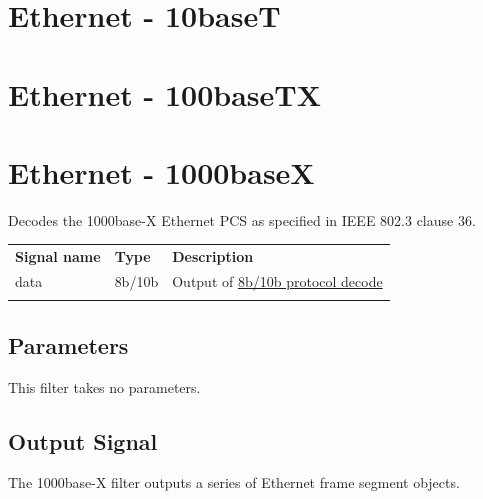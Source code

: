 \pagebreak
\section{Ethernet - 10baseT}

\pagebreak
\section{Ethernet - 100baseTX}

\pagebreak
\section{Ethernet - 1000baseX}
\label{proto:1000basex}

Decodes the 1000base-X Ethernet PCS as specified in IEEE 802.3 clause 36.

\begin{tabularx}{16cm}{llX}
\thickhline
\textbf{Signal name} & \textbf{Type} & \textbf{Description} \\
\thickhline
data & 8b/10b & Output of \hyperref[proto:8b10b]{8b/10b protocol decode}\\
\thickhline
\end{tabularx}

\subsection{Parameters}

This filter takes no parameters.

\subsection{Output Signal}

The 1000base-X filter outputs a series of Ethernet frame segment objects.

